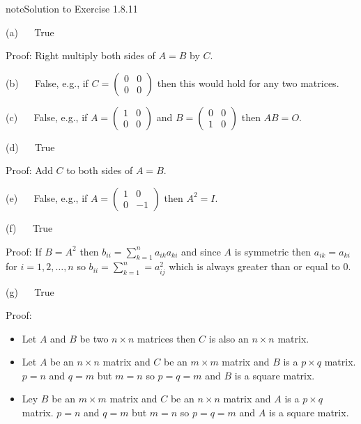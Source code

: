 \documentclass[letterpaper,10pt,english]{jupyterBook}
\begin{document}
\begin{sphinxadmonition}{note}{Solution to Exercise 1.8.11}



\sphinxAtStartPar
(a)   True

\sphinxAtStartPar
Proof: Right multiply both sides of \(A = B\) by \(C\).

\sphinxAtStartPar
(b)   False, e.g., if \(C = \begin{pmatrix} 0 & 0 \\ 0 & 0 \end{pmatrix}\) then this would hold for any two matrices.

\sphinxAtStartPar
(c)   False, e.g., if \(A = \begin{pmatrix} 1 & 0 \\ 0 & 0 \end{pmatrix}\) and \(B = \begin{pmatrix} 0 & 0 \\ 1 & 0 \end{pmatrix}\) then \(AB = O\).

\sphinxAtStartPar
(d)   True

\sphinxAtStartPar
Proof: Add \(C\) to both sides of \(A = B\).

\sphinxAtStartPar
(e)   False, e.g., if \(A = \begin{pmatrix} 1 & 0 \\ 0 & -1 \end{pmatrix}\) then \(A^2 = I\).

\sphinxAtStartPar
(f)   True

\sphinxAtStartPar
Proof: If \(B = A^2\) then \(b_{ii} = \sum_{k=1}^n a_{ik}a_{ki}\) and since \(A\) is symmetric then \(a_{ik} = a_{ki}\) for \(i = 1, 2, \ldots, n\) so \(b_{ii} = \sum_{k=1}^n = a_{ij}^2\) which is always greater than or equal to 0.

\sphinxAtStartPar
(g)   True

\sphinxAtStartPar
Proof:
\begin{itemize}
\item {} 
\sphinxAtStartPar
Let \(A\) and \(B\) be two \(n \times n\) matrices then \(C\) is also an \(n \times n\) matrix.

\item {} 
\sphinxAtStartPar
Let \(A\) be an \(n \times n\) matrix and \(C\) be an \(m \times m\) matrix and \(B\) is a \(p \times q\) matrix. \(p = n\) and \(q = m\) but \(m = n\) so \(p = q = m\) and \(B\) is a square matrix.

\item {} 
\sphinxAtStartPar
Ley \(B\) be an \(m \times m\) matrix and \(C\) be an \(n \times n\) matrix and \(A\) is a \(p \times q\) matrix. \(p = n\) and \(q = m\) but \(m = n\) so \(p = q = m\) and \(A\) is a square matrix.


\end{itemize}
\end{sphinxadmonition}
\end{document}
